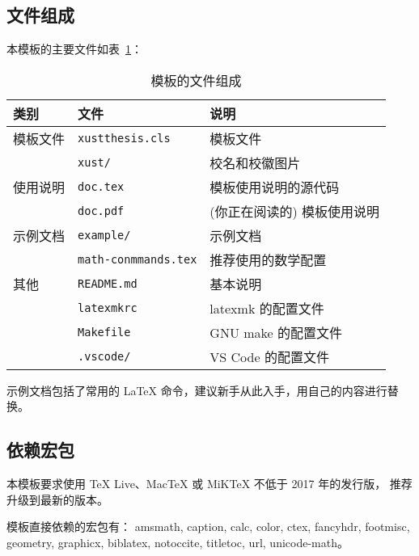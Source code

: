 \documentclass[a4paper]{ltxdoc}
\DeclareRobustCommand\file{\nolinkurl}
\DeclareRobustCommand\pkg{\textsf}
\begin{document}
\subsection{文件组成}
本模板的主要文件如表~\ref{tab:files}：
\begin{table}[htb]
  \centering\small
  \caption{模板的文件组成}
  \label{tab:files}
  \begin{tabular}{lll}
    \toprule
    类别     & 文件                      & 说明                        \\
    \midrule
    模板文件 & \file{xustthesis.cls}     & 模板文件                    \\
             & \file{xust/}              & 校名和校徽图片              \\
    \midrule
    使用说明 & \file{doc.tex}            & 模板使用说明的源代码        \\
             & \file{doc.pdf}            & (你正在阅读的) 模板使用说明 \\
    \midrule
    示例文档 & \file{example/}           & 示例文档                    \\
             & \file{math-conmmands.tex} & 推荐使用的数学配置          \\
    \midrule
    其他     & \file{README.md}          & 基本说明                    \\
             & \file{latexmkrc}          & latexmk 的配置文件          \\
             & \file{Makefile}           & GNU make 的配置文件         \\
             & \file{.vscode/}           & VS Code 的配置文件          \\
    \bottomrule
  \end{tabular}
\end{table}

示例文档包括了常用的 \LaTeX{} 命令，建议新手从此入手，用自己的内容进行替换。


\subsection{依赖宏包}

本模板要求使用 TeX Live、MacTeX 或 MiKTeX 不低于 2017 年的发行版，
推荐升级到最新的版本。

模板直接依赖的宏包有：
\pkg{amsmath},
\pkg{caption},
\pkg{calc},
\pkg{color},
\pkg{ctex},
\pkg{fancyhdr},
\pkg{footmisc},
\pkg{geometry},
\pkg{graphicx},
\pkg{biblatex},
\pkg{notoccite},
\pkg{titletoc},
\pkg{url},
\pkg{unicode-math}。
\end{document}

